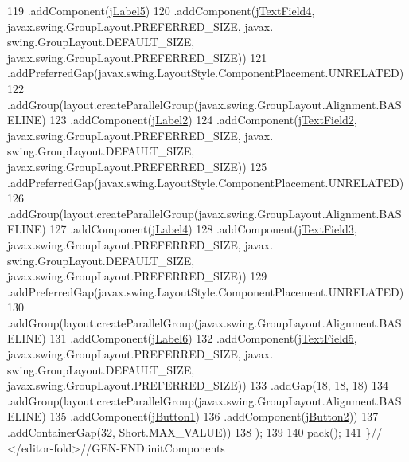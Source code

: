 \begin{DoxyCode}
119                     .addComponent(\mbox{\hyperlink{classsoftware_1_1registrar_a8155b7123176cb4088549ac2325f25f4}{jLabel5}})
120                     .addComponent(\mbox{\hyperlink{classsoftware_1_1registrar_a439caf9553404d6b620bd02d9dd6c644}{jTextField4}}, javax.swing.GroupLayout.PREFERRED\_SIZE, javax.
      swing.GroupLayout.DEFAULT\_SIZE, javax.swing.GroupLayout.PREFERRED\_SIZE))
121                 .addPreferredGap(javax.swing.LayoutStyle.ComponentPlacement.UNRELATED)
122                 .addGroup(layout.createParallelGroup(javax.swing.GroupLayout.Alignment.BASELINE)
123                     .addComponent(\mbox{\hyperlink{classsoftware_1_1registrar_a24b0c3144951c1a694a839a57632b467}{jLabel2}})
124                     .addComponent(\mbox{\hyperlink{classsoftware_1_1registrar_a3270231d8e402db892c290279dcdb893}{jTextField2}}, javax.swing.GroupLayout.PREFERRED\_SIZE, javax.
      swing.GroupLayout.DEFAULT\_SIZE, javax.swing.GroupLayout.PREFERRED\_SIZE))
125                 .addPreferredGap(javax.swing.LayoutStyle.ComponentPlacement.UNRELATED)
126                 .addGroup(layout.createParallelGroup(javax.swing.GroupLayout.Alignment.BASELINE)
127                     .addComponent(\mbox{\hyperlink{classsoftware_1_1registrar_a1cc93efa5caf9078801eef6056e86867}{jLabel4}})
128                     .addComponent(\mbox{\hyperlink{classsoftware_1_1registrar_ac033f6f71314c40dbfb8d1925cc363f5}{jTextField3}}, javax.swing.GroupLayout.PREFERRED\_SIZE, javax.
      swing.GroupLayout.DEFAULT\_SIZE, javax.swing.GroupLayout.PREFERRED\_SIZE))
129                 .addPreferredGap(javax.swing.LayoutStyle.ComponentPlacement.UNRELATED)
130                 .addGroup(layout.createParallelGroup(javax.swing.GroupLayout.Alignment.BASELINE)
131                     .addComponent(\mbox{\hyperlink{classsoftware_1_1registrar_a613b33aab588faff234599788161a0aa}{jLabel6}})
132                     .addComponent(\mbox{\hyperlink{classsoftware_1_1registrar_a02ef72d4de1e5346b47314c18049f0ba}{jTextField5}}, javax.swing.GroupLayout.PREFERRED\_SIZE, javax.
      swing.GroupLayout.DEFAULT\_SIZE, javax.swing.GroupLayout.PREFERRED\_SIZE))
133                 .addGap(18, 18, 18)
134                 .addGroup(layout.createParallelGroup(javax.swing.GroupLayout.Alignment.BASELINE)
135                     .addComponent(\mbox{\hyperlink{classsoftware_1_1registrar_aef5c4d6cf5be63bd07f311ce4f590faf}{jButton1}})
136                     .addComponent(\mbox{\hyperlink{classsoftware_1_1registrar_aad55bb3040eec6aa4685c2641dbff85b}{jButton2}}))
137                 .addContainerGap(32, Short.MAX\_VALUE))
138         );
139 
140         pack();
141     \}\textcolor{comment}{// </editor-fold>//GEN-END:initComponents}
\end{DoxyCode}
\mbox{\label{classsoftware_1_1registrar_a2a5f3499b73d8cb0b16f8487a80d056f}} 
